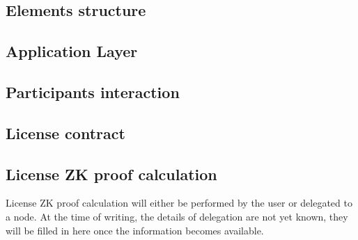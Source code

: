

\subsection{Elements structure}
\label{sec:implementation:elements}



\subsection{Application Layer}
\label{sec:implementation:application-layer}


\subsection{Participants interaction}
\label{sec:implementation:participants-interaction}


\subsection{License contract}
\label{sec:implementation:license-contract}


\subsection{License ZK proof calculation}

License ZK proof calculation will either be performed by the user or delegated to a node. At the time of writing, the details of delegation are not yet known, they will be filled in here once the information becomes available.
